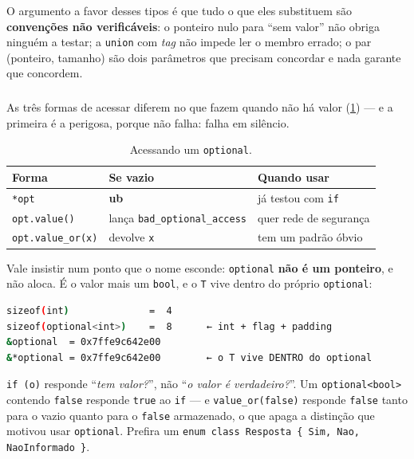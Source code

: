 O argumento a favor desses tipos é que tudo o que eles substituem são
\textbf{convenções não verificáveis}: o ponteiro nulo para ``sem valor'' não obriga ninguém a testar; a
\texttt{union} com \emph{tag} não impede ler o membro errado; o par (ponteiro,
tamanho) são dois parâmetros que precisam concordar e nada garante que
concordem.

\subsubsection{}

As três formas de acessar diferem no que fazem quando não há valor
(\cref{tab:optional-acesso}) --- e a primeira é a perigosa, porque não falha:
falha em silêncio.

\begin{table}[htbp]
\centering
\caption{Acessando um \texttt{optional}.}
\label{tab:optional-acesso}
\footnotesize
\begin{tabular}{@{}lll@{}}
\toprule
\textbf{Forma} & \textbf{Se vazio} & \textbf{Quando usar} \\
\midrule
\texttt{*opt}            & \textbf{\gls{ub}}                 & já testou com \texttt{if} \\
\texttt{opt.value()}     & lança \texttt{bad\_optional\_access} & quer rede de segurança \\
\texttt{opt.value\_or(x)}& devolve \texttt{x}                & tem um padrão óbvio \\
\bottomrule
\end{tabular}
\end{table}

Vale insistir num ponto que o nome esconde: \texttt{optional} \textbf{não é um
ponteiro}, e não aloca. É o valor mais um \texttt{bool}, e o \texttt{T} vive
dentro do próprio \texttt{optional}:

\begin{lstlisting}[style=bt, language=bash,
    caption={Saída de \texttt{src/vocabulary\_types/}.}]
sizeof(int)              =  4
sizeof(optional<int>)    =  8      ← int + flag + padding
&optional  = 0x7ffe9c642e00
&*optional = 0x7ffe9c642e00        ← o T vive DENTRO do optional
\end{lstlisting}

\begin{armadilha}
\texttt{if (o)} responde ``\emph{tem valor?}'', não ``\emph{o valor é
verdadeiro?}''. Um \texttt{optional<bool>} contendo \texttt{false} responde
\texttt{true} ao \texttt{if} --- e \texttt{value\_or(false)} responde
\texttt{false} tanto para o vazio quanto para o \texttt{false} armazenado, o que
apaga a distinção que motivou usar \texttt{optional}. Prefira um
\texttt{enum class Resposta \{ Sim, Nao, NaoInformado \}}.
\end{armadilha}

